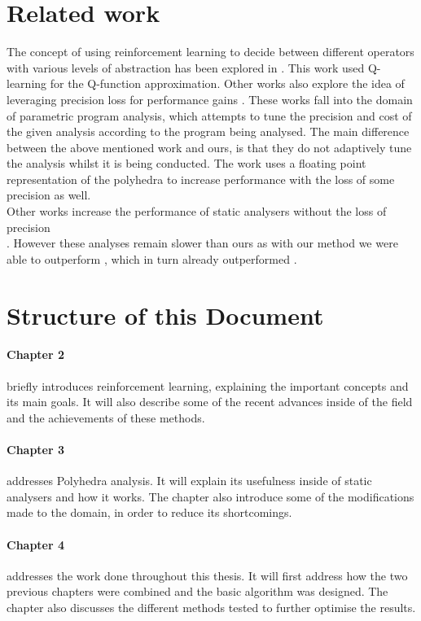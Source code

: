\section{Related work}
The concept of using reinforcement learning to decide between different operators with various levels of abstraction has been explored in \cite{singh2018fast}. This work used Q-learning for the Q-function approximation. Other works also explore the idea of leveraging precision loss for performance gains \cite{oh2015learning,oh2014selective,liang2011learning}. These works fall into the domain of parametric program analysis, which attempts to tune the precision and cost of the given analysis according to the program being analysed. The main difference between the above mentioned work and ours, is that they do not adaptively tune the analysis whilst it is being conducted. The work \cite{chen2008sound} uses a floating point representation of the polyhedra to increase performance with the loss of some precision as well.\\
Other works increase the performance of static analysers without the loss of precision \\ \cite{singh2015making,singh2017fast}. However these analyses remain slower than ours as with our method we were able to outperform \cite{singh2018fast}, which in turn already outperformed \cite{singh2017fast}.


\section{Structure of this Document}

\paragraph{Chapter 2}briefly introduces reinforcement learning, explaining the important concepts and its main goals. It will also describe some of the recent advances inside of the field and the achievements of these methods.

\paragraph{Chapter 3}addresses Polyhedra analysis. It will explain its usefulness inside of static analysers and how it works. The chapter also introduce some of the modifications made to the domain, in order to reduce its shortcomings.

\paragraph{Chapter 4}addresses the work done throughout this thesis. It will first address how the two previous chapters were combined and the basic algorithm was designed. The chapter also discusses the different methods tested to further optimise the results.

